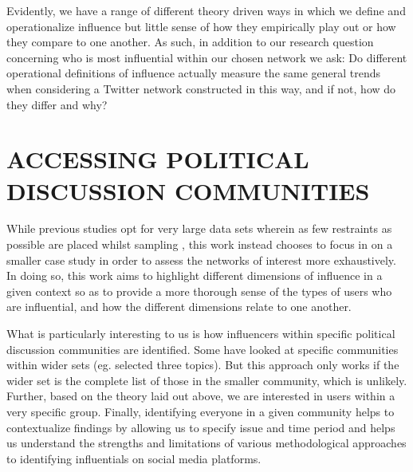 \documentclass[a4paper,12pt]{article}
\begin{document}



Evidently, we have a range of different theory driven ways in which we define and operationalize influence but little sense of how they empirically play out or how they compare to one another. As such, in addition to our research question concerning who is most influential within our chosen network we ask: Do different operational definitions of influence actually measure the same general trends when considering a Twitter network constructed in this way, and if not, how do they differ and why? 


\section{ACCESSING POLITICAL DISCUSSION COMMUNITIES}

While previous studies opt for very large data sets wherein as few restraints as possible are placed whilst sampling \cite{Bakshy, Cha}, this work instead chooses to focus in on a smaller case study in order to assess the networks of interest more exhaustively. In doing so, this work aims to highlight different dimensions of influence in a given context so as to provide a more thorough sense of the types of users who are influential, and how the different dimensions relate to one another.

What is particularly interesting to us is how influencers within specific political discussion communities are identified. Some have looked at specific communities within wider sets (eg. \cite{Cha} selected three topics). But this approach only works if the wider set is the complete list of those in the smaller community, which is unlikely. Further, based on the theory laid out above, we are interested in users within a very specific group. Finally, identifying everyone in a given community helps to contextualize findings by allowing us to specify issue and time period and helps us understand the strengths and limitations of various methodological approaches to identifying influentials on social media platforms.
\end{document}
